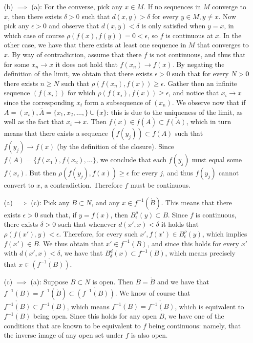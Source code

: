 \begin{solution}
    (b) $\implies$ (a): For the converse, pick any $x \in M$.
    If no sequences in $M$ converge to $x$, then there exists $\delta > 0$ such that $d(x, y) > \delta$ for every $y \in M, y \neq x$.
    Now pick any $\epsilon > 0$ and observe that $d(x, y) < \delta$ is only satisfied when $y = x$, in which case of course $\rho(f(x), f(y)) = 0 < \epsilon$, so $f$ is continuous at $x$.
    In the other case, we have that there exists at least one sequence in $M$ that converges to $x$.
    By way of contradiction, assume that there $f$ is not continuous, and thus that for some $x_n \rightarrow x$ it does not hold that $f(x_n) \rightarrow f(x)$.
    By negating the definition of the limit, we obtain that there exists $\epsilon > 0$ such that for every $N > 0$ there exists $n \geq N$ such that $\rho(f(x_n), f(x)) \geq \epsilon$.
    Gather then an infinite sequence $(f(x_i))$ for which $\rho(f(x_i), f(x)) \geq \epsilon$, and notice that $x_i \rightarrow x$ since the corresponding $x_i$ form a subsequence of $(x_n)$.
    We observe now that if $A = (x_i), \overline{A} = \{x_1, x_2, \ldots, \} \cup \{x\}$: this is due to the uniqueness of the limit, as well as the fact that $x_i \rightarrow x$.
    Then $f(x) \in f(\overline{A}) \subset \overline{f(A)}$, which in turn means that there exists a sequence $(f(y_j)) \subset f(A)$ such that $f(y_j) \rightarrow f(x)$ (by the definition of the closure).
    Since $f(A) = \{f(x_1), f(x_2), \ldots\}$, we conclude that each $f(y_j)$ must equal some $f(x_i)$.
    But then $\rho(f(y_j), f(x)) \geq \epsilon$ for every $j$, and thus $f(y_j)$ cannot convert to $x$, a contradiction.
    Therefore $f$ must be continuous.

    (a) $\implies$ (c): Pick any $B \subset N$, and any $x \in f^{-1}(\mathring{B})$.
    This means that there exists $\epsilon > 0$ such that, if $y = f(x)$, then $B_{\epsilon}^{\rho}(y) \subset B$.
    Since $f$ is continuous, there exists $\delta > 0$ such that whenever $d(x', x) < \delta$ it holds that $\rho(f(x'), y) < \epsilon$.
    Therefore, for every such $x', f(x') \in B_{\epsilon}^{\rho}(y)$, which implies $f(x') \in B$.
    We thus obtain that $x' \in f^{-1}(B)$, and since this holds for every $x'$ with $d(x', x) < \delta$, we have that $B_{\delta}^{d}(x) \subset f^{-1}(B)$, which means precisely that $x \in \mathring{(f^{-1}(B))}$.

    (c) $\implies$ (a): Suppose $B \subset N$ is open.
    Then $B = \mathring{B}$ and we have that $f^{-1}(B) = f^{-1}(\mathring{B}) \subset \mathring{(f^{-1}(B))}$.
    We know of course that $\mathring{f^{-1}(B)} \subset f^{-1}(B)$, which means $f^{-1}(B) = \mathring{f^{-1}(B)}$, which is equivalent to $f^{-1}(B)$ being open.
    Since this holds for any open $B$, we have one of the conditions that are known to be equivalent to $f$ being continuous: namely, that the inverse image of any open set under $f$ is also open.


\end{solution}
